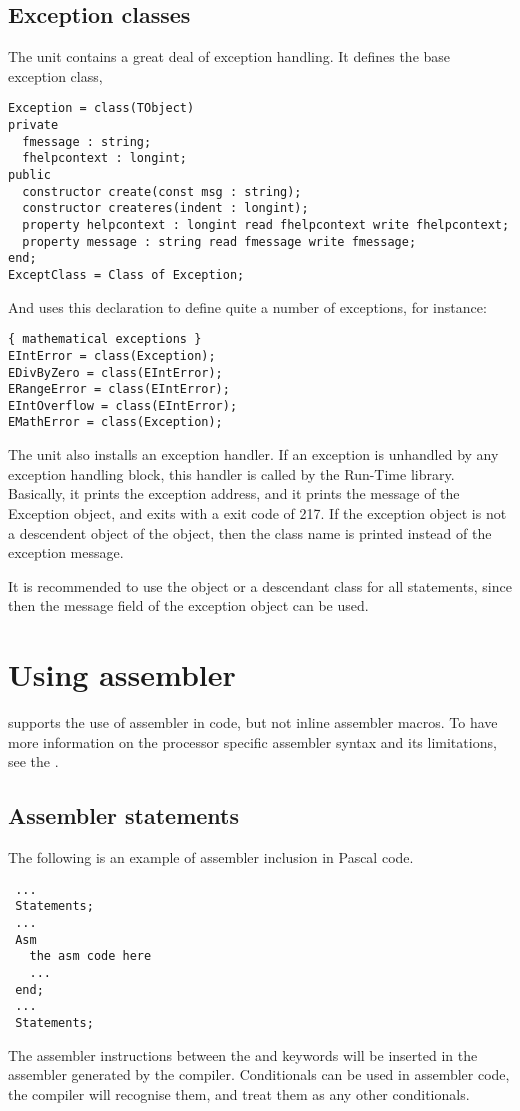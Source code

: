 \section{Exception classes}
\label{se:exceptclasses}
The  unit contains a great deal of exception handling.
It defines the base exception class, 
\begin{verbatim}
Exception = class(TObject)
private
  fmessage : string;
  fhelpcontext : longint;
public
  constructor create(const msg : string);
  constructor createres(indent : longint);
  property helpcontext : longint read fhelpcontext write fhelpcontext;
  property message : string read fmessage write fmessage;
end;
ExceptClass = Class of Exception;
\end{verbatim}
And uses this declaration to define quite a number of exceptions, for
instance:
\begin{verbatim}
{ mathematical exceptions }
EIntError = class(Exception);
EDivByZero = class(EIntError);
ERangeError = class(EIntError);
EIntOverflow = class(EIntError);
EMathError = class(Exception);
\end{verbatim}
The  unit also installs an exception handler. If an exception is
unhandled by any exception handling block, this handler is called by the
Run-Time library. Basically, it prints the exception address, and it prints
the message of the Exception object, and exits with a exit code of 217.
If the exception object is not a descendent object of the 
object, then the class name is printed instead of the exception message.

It is recommended to use the  object or a descendant class for
all  statements, since then the message field of the exception 
object can be used.

\chapter{Using assembler}
\fpc supports the use of assembler in code, but not inline
assembler macros.  To have more information on the processor
specific assembler syntax and its limitations, see the \progref.

\section{Assembler statements }
The following is an example of assembler inclusion in Pascal code.
\begin{verbatim}
 ...
 Statements;
 ...
 Asm
   the asm code here
   ...
 end;
 ...
 Statements;
\end{verbatim}
The assembler instructions between the  and  keywords will
be inserted in the assembler generated by the compiler.
Conditionals can be used in assembler code, the compiler will recognise them,
and treat them as any other conditionals.

